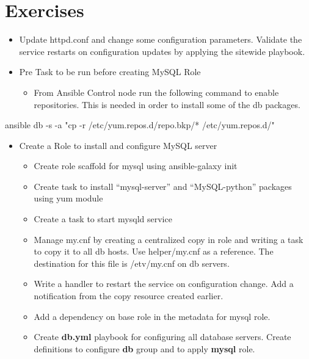 \section{Exercises}

\begin{itemize}
\item Update httpd.conf and change some configuration parameters. Validate the service restarts on configuration updates by applying the sitewide playbook.
\item Pre Task to be run before creating MySQL Role

\begin{itemize}
\item From Ansible Control node run the following command to enable repositories. This is needed in order to install some of the db packages.
\end{itemize}
\end{itemize}

\begin{code}
ansible db -s -a "cp -r /etc/yum.repos.d/repo.bkp/* /etc/yum.repos.d/"
\end{code}

\begin{itemize}
\item Create a Role to install and configure MySQL server


\begin{itemize}
\item Create role scaffold for mysql  using ansible-galaxy init
\item Create task to install ``mysql-server'' and ``MySQL-python'' packages using yum module
\item Create a task to start mysqld service
\item Manage my.cnf by creating a centralized copy in role and writing a task to copy it to all db hosts. Use helper/my.cnf as a reference. The destination for this file is /etv/my.cnf on db servers.
\item Write a handler to restart the service on configuration change. Add a notification from the copy resource created earlier.
\item Add a dependency on base role in the metadata for mysql role.
\item Create  \textbf{db.yml} playbook for configuring all database servers. Create definitions to configure \textbf{db} group and to apply \textbf{mysql} role.
\end{itemize}
\end{itemize}